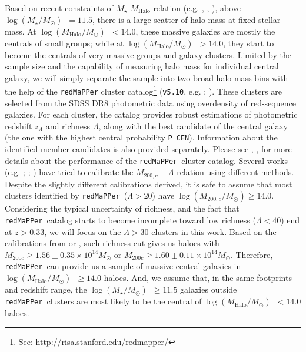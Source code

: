 \documentclass[preprint]{aastex}
\def\redm{\texttt{redMaPPer}}
\def\logms{{$\log (M_{\star}/M_{\odot})$}~}
\def\logmh{{$\log (M_{\mathrm{Halo}}/M_{\odot})$}~}
\begin{document}
\begin{CJK*}{UTF8}{gbsn}
    Based on recent constraints of $M_{\star}$-$M_{\mathrm{Halo}}$ relation 
    (e.g. \citealt{Leauthaud2012}, \citealt{Behroozi2013}, \citealt{Kravtsov2014}), 
    above \logms$ = 11.5$, there is a large scatter of halo mass at fixed stellar mass.  
    At \logmh$<14.0$, these massive galaxies are mostly the centrals of small groups;
    while at \logmh$>14.0$, they start to become the centrals of very massive groups and
    galaxy clusters.   
    Limited by the sample size and the capability of measuring halo mass for individual
    central galaxy, we will simply separate the sample into two broad halo mass bins with
    the help of the \redm{} cluster catalog\footnote{See:
    http://risa.stanford.edu/redmapper/} (\texttt{v5.10}, e.g. \citealt{Rykoff2014};
    \citealt{Rozo2015b}).
    These clusters are selected from the SDSS DR8 photometric data using overdensity of
    red-sequence galaxies. 
    For each cluster, the catalog provides robust estimations of photometric redshift
    $z_{\Lambda}$ and richness $\Lambda$, along with the best candidate of the central
    galaxy (the one with the highest central probability \texttt{P\_CEN}).
    Information about the identified member candidates is also provided separately. 
    Please see \citet{Rozo2014}, \citet{Rozo2015a}, \citet{Rozo2015b} for more details 
    about the performance of the \redm~cluster catalog.      
    Several works (e.g. \citealt{Saro2015}; \citealt{Farahi2016}; \citealt{Simet2016})
    have tried to calibrate the $M_{200, c}-\Lambda$ relation using different methods.
    Despite the slightly different calibrations derived, it is safe to assume that most
    clusters identified by \redm~($\Lambda > 20$) have $\log (M_{200,c}/M_{\odot}) \geq
    14.0$.  
    Considering the typical uncertainty of richness, and the fact that \redm~catalog
    starts to become incomplete toward low richness ($\Lambda < 40$) end at $z > 0.33$, we
    will focus on the $\Lambda > 30$ clusters in this work.  
    Based on the calibrations from \citet{Farahi2016} or \citet{Simet2016}, 
    such richness cut gives us haloes with 
    $M_{200c} \geq 1.56\pm0.35 \times 10^{14} M_{\odot}$ or 
    $M_{200c} \geq 1.60\pm0.11 \times 10^{14} M_{\odot}$.  
    Therefore, \redm~can provide us a sample of massive central galaxies in \logmh$\geq
    14.0$ haloes.  
    And, we assume that, in the same footprints and redshift range, the \logms$\geq 11.5$
    galaxies outside \redm~clusters are most likely to be the central of \logmh$< 14.0$
    haloes. 
    

\end{CJK*}
\end{document}
